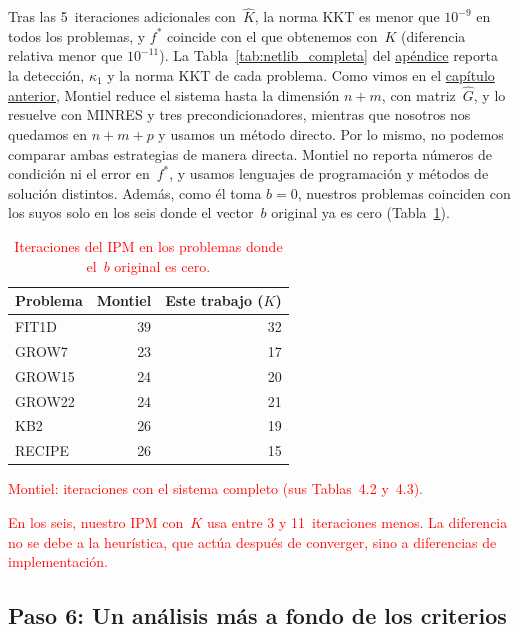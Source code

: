 Tras las 5~iteraciones adicionales con~$\widehat{K}$, la norma KKT es menor que $10^{-9}$ en todos los problemas, y $f^*$ coincide con el que obtenemos con~$K$ (diferencia relativa menor que $10^{-11}$). La Tabla~\ref{tab:netlib_completa} del \hyperref[app:netlib_completa]{apéndice} reporta la detección, $\kappa_1$ y la norma KKT de cada problema.
Como vimos en el \hyperref[par:montiel]{capítulo anterior}, Montiel reduce el sistema hasta la dimensión $n+m$, con matriz~$\widehat{G}$, y lo resuelve con MINRES y tres precondicionadores, mientras que nosotros nos quedamos en $n+m+p$ y usamos un método directo.
Por lo mismo, no podemos comparar ambas estrategias de manera directa. Montiel no reporta números de condición ni el error en~$f^*$, y usamos lenguajes de programación y métodos de solución distintos.
Además, como él toma $b = 0$, nuestros problemas coinciden con los suyos solo en los seis donde el vector~$b$ original ya es cero (Tabla~\ref{tab:netlib_montiel}).

\begin{table}[H]
\centering
\caption{\textcolor{red}{Iteraciones del IPM en los problemas donde el~$b$ original es cero.}}
\label{tab:netlib_montiel}
\small
\begin{tabular}{l r r}
\toprule
Problema & Montiel & Este trabajo ($K$) \\
\midrule
FIT1D    & 39 & 32 \\
GROW7    & 23 & 17 \\
GROW15   & 24 & 20 \\
GROW22   & 24 & 21 \\
KB2      & 26 & 19 \\
RECIPE   & 26 & 15 \\
\bottomrule
\end{tabular}

\vspace{0.3em}
\footnotesize
\textcolor{red}{Montiel: iteraciones con el sistema completo (sus Tablas~4.2 y~4.3).}
\end{table}

\textcolor{red}{En los seis, nuestro IPM con~$K$ usa entre 3 y 11~iteraciones menos. La diferencia no se debe a la heurística, que actúa después de converger, sino a diferencias de implementación.}



\subsection*{Paso 6: Un análisis más a fondo de los criterios}\label{sec:analisis_criterios}


